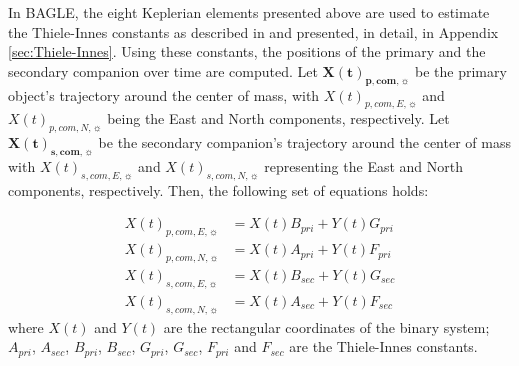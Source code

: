 \documentclass[twocolumn]{aastex701}
\newcommand{\vect}[1]{\boldsymbol{#1}}
\newcommand{\Xcomp}{\vect{X(t)}_{\boldsymbol{p},\boldsymbol{com},\sun}}
\newcommand{\Xcoms}{\vect{X(t)}_{\boldsymbol{s},\boldsymbol{com},\sun}}
\newcommand{\Xcomep}{{X(t)}_{{p, {com}, E},\sun}}
\newcommand{\Xcomnp}{{X(t)}_{{p, {com}, N},\sun}}
\newcommand{\Xcomes}{{X(t)}_{{s, {com}, E},\sun}}
\newcommand{\Xcomns}{{X(t)}_{{s, {com}, N},\sun}}
\newcommand{\Apri}{A_{pri}}
\newcommand{\Asec}{A_{sec}}
\newcommand{\Bpri}{B_{pri}}
\newcommand{\Bsec}{B_{sec}}
\newcommand{\Fpri}{F_{pri}}
\newcommand{\Fsec}{F_{sec}}
\newcommand{\Gpri}{G_{pri}}
\newcommand{\Gsec}{G_{sec}}
\begin{document}
In BAGLE, the eight Keplerian elements presented above are used to estimate the Thiele-Innes constants as described in \citet{Koren_2016} and presented, in detail, in Appendix \ref{sec:Thiele-Innes}. Using these constants, the positions of the primary and the secondary companion over time are computed. Let  $\Xcomp$ be the primary object's trajectory around the center of mass, with $\Xcomep$ and  $\Xcomnp$ being the East and North components, respectively. Let  $\Xcoms$ be the secondary companion's trajectory around the center of mass with $\Xcomes$ and  $\Xcomns$ representing the East and North components, respectively. Then, the following set of equations holds: 








\begin{eqnarray}
\label{eqn:tinnes}
    \Xcomep &= X(t) \Bpri + Y(t) \Gpri  \nonumber \\
    \Xcomnp &= X(t) \Apri + Y(t) \Fpri  \nonumber \\
    \Xcomes &= X(t) \Bsec + Y(t) \Gsec \nonumber \\
    \Xcomns &= X(t) \Asec + Y(t) \Fsec 
\end{eqnarray}
where $X(t)$ and $Y(t)$ are the rectangular coordinates of the binary system; $A_{pri}$, $A_{sec}$, $B_{pri}$, $B_{sec}$, $G_{pri}$, $G_{sec}$, $F_{pri}$ and $F_{sec}$ are the Thiele-Innes constants. 
\end{document}
